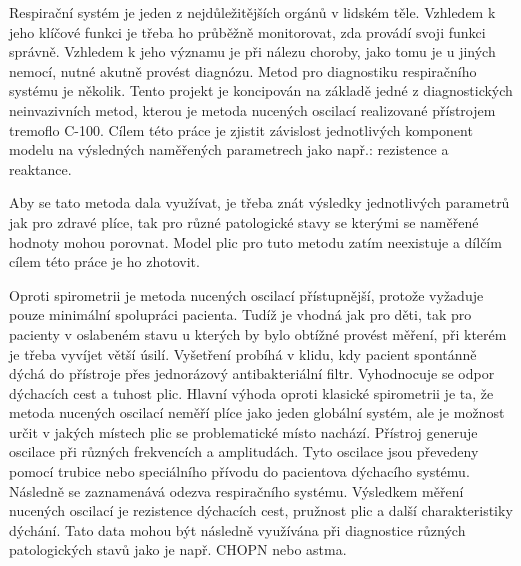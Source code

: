 Respirační systém je jeden z nejdůležitějších orgánů v lidském těle. Vzhledem k jeho klíčové funkci je třeba ho průběžně monitorovat, zda provádí svoji funkci správně. Vzhledem k jeho významu je při nálezu choroby, jako tomu je u jiných nemocí, nutné akutně provést diagnózu. 
Metod pro diagnostiku respiračního systému je několik. Tento projekt je koncipován na základě jedné z diagnostických neinvazivních metod, kterou je metoda nucených oscilací realizované přístrojem tremoflo C-100. Cílem této práce je zjistit závislost jednotlivých komponent modelu na výsledných naměřených parametrech jako např.: rezistence a reaktance. \cite{Vlcek2018}


Aby se tato metoda dala využívat, je třeba znát výsledky jednotlivých parametrů jak pro zdravé plíce, tak pro různé patologické stavy se kterými se naměřené hodnoty mohou porovnat. Model plic pro tuto metodu zatím neexistuje a dílčím cílem této práce je ho zhotovit. 


Oproti spirometrii je metoda nucených oscilací přístupnější, protože vyžaduje pouze minimální spolupráci pacienta. Tudíž je vhodná jak pro děti, tak pro pacienty v oslabeném stavu u kterých by bylo obtížné provést měření, při kterém je třeba vyvíjet větší úsilí. \cite{Vlcek2018} Vyšetření probíhá v klidu, kdy pacient spontánně dýchá do přístroje přes jednorázový antibakteriální filtr. Vyhodnocuje se odpor dýchacích cest a tuhost plic. \cite{Vlcek2018}
Hlavní výhoda oproti klasické spirometrii je ta, že metoda nucených oscilací neměří plíce jako jeden globální systém, ale je možnost určit v jakých místech plic se problematické místo nachází. \cite{Vlcek2018}
Přístroj generuje oscilace při různých frekvencích a amplitudách. Tyto oscilace jsou převedeny pomocí trubice nebo speciálního přívodu do pacientova dýchacího systému. Následně se zaznamenává odezva respiračního systému. Výsledkem měření nucených oscilací je rezistence dýchacích cest, pružnost plic a další charakteristiky dýchání. Tato data mohou být následně využívána při diagnostice různých patologických stavů jako je např. CHOPN nebo astma. \cite{Vlcek2018}

